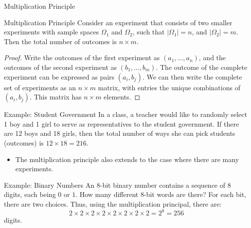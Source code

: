 \begin{frame}[allowframebreaks]{Multiplication Principle}

  \begin{block}{Multiplication Principle}
  Consider an experiment that consists of two smaller experiments with sample spaces $\Omega_1$ and $\Omega_2$, such that $|\Omega_1| = n$, and $|\Omega_2| = m$. Then the total number of outcomes is $n \times m$.
  \end{block}
  
  \begin{proof}
    Write the outcomes of the first experiment as $(a_1, \ldots, a_n)$, and the outcomes of the second experiment as $(b_1, \ldots, b_m)$. The outcome of the complete experiment can be expressed as pairs $(a_i, b_j)$. We can then write the complete set of experiments as an $n \times m$ matrix, with entries the unique combinations of $(a_i, b_j)$. This matrix has $n \times m$ elements.
  \end{proof}
  
  \begin{exampleblock}{Example: Student Government}
    In a class, a teacher would like to randomly select 1 boy and 1 girl to serve as representatives to the student government. If there are 12 boys and 18 girls, then the total number of ways she can pick students (outcomes) is $12 \times 18 = 216$.
  \end{exampleblock}
  
  \begin{itemize}
    \item The multiplication principle also extends to the case where there are many experiments.
  \end{itemize}
  
  \begin{exampleblock}{Example: Binary Numbers}
    An 8-bit binary number contains a sequence of 8 digits, each being $0$ or $1$. How many different $8$-bit words are there? For each bit, there are two choices. Thus, using the multiplication principal, there are:
    $$
    2 \times 2 \times 2 \times 2 \times 2 \times 2 \times 2 \times 2 = 2^8 = 256
    $$
    digits.
  \end{exampleblock}
\end{frame}

